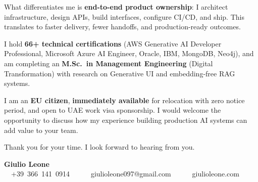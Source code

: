 \documentclass[11pt,a4paper,sans]{moderncv}
\begin{document}
\vspace{0.5em}

What differentiates me is \textbf{end-to-end product ownership}: I architect infrastructure, design APIs, build interfaces, configure CI/CD, and ship. This translates to faster delivery, fewer handoffs, and production-ready outcomes.

\vspace{0.5em}

I hold \textbf{66+ technical certifications} (AWS Generative AI Developer Professional, Microsoft Azure AI Engineer, Oracle, IBM, MongoDB, Neo4j), and am completing an \textbf{M.Sc.\ in Management Engineering} (Digital Transformation) with research on Generative UI and embedding-free RAG systems.

\vspace{0.5em}

I am an \textbf{EU citizen}, \textbf{immediately available} for relocation with zero notice period, and open to UAE work visa sponsorship. I would welcome the opportunity to discuss how my experience building production AI systems can add value to your team.

\vspace{0.8em}

Thank you for your time. I look forward to hearing from you.

\vspace{1.2em}

\textbf{Giulio Leone}\\
\faPhone~~+39~366~141~0914~~\textbar~~\faEnvelope~~giulioleone097@gmail.com~~\textbar~~\faGlobe~~giulioleone.com
\end{document}
